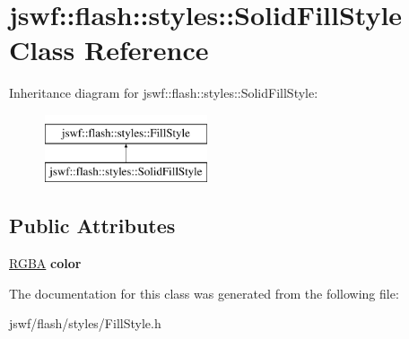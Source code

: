 \hypertarget{classjswf_1_1flash_1_1styles_1_1_solid_fill_style}{\section{jswf\+:\+:flash\+:\+:styles\+:\+:Solid\+Fill\+Style Class Reference}
\label{classjswf_1_1flash_1_1styles_1_1_solid_fill_style}
}
Inheritance diagram for jswf\+:\+:flash\+:\+:styles\+:\+:Solid\+Fill\+Style\+:\begin{figure}[H]
\begin{center}
\leavevmode
\includegraphics[height=2.000000cm]{classjswf_1_1flash_1_1styles_1_1_solid_fill_style}
\end{center}
\end{figure}
\subsection*{Public Attributes}
\begin{DoxyCompactItemize}
\item 
\hypertarget{classjswf_1_1flash_1_1styles_1_1_solid_fill_style_adc0fd4f617f7038d328c8bb2a2c49a37}{\hyperlink{structjswf_1_1flash_1_1_r_g_b_a}{R\+G\+B\+A} {\bfseries color}}\label{classjswf_1_1flash_1_1styles_1_1_solid_fill_style_adc0fd4f617f7038d328c8bb2a2c49a37}

\end{DoxyCompactItemize}


The documentation for this class was generated from the following file\+:\begin{DoxyCompactItemize}
\item 
jswf/flash/styles/Fill\+Style.\+h\end{DoxyCompactItemize}
